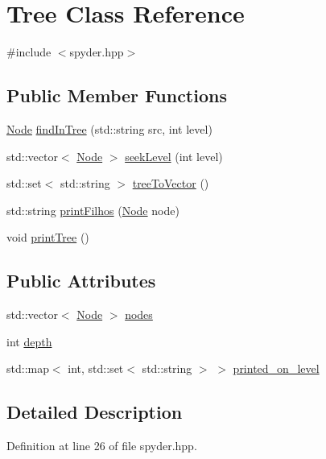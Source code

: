 \hypertarget{class_tree}{}\section{Tree Class Reference}
\label{class_tree}


{\ttfamily \#include $<$spyder.\+hpp$>$}

\subsection*{Public Member Functions}
\begin{DoxyCompactItemize}
\item 
\hyperlink{class_node}{Node} \hyperlink{class_tree_ad882c6f8facefed5874a603852cd3241}{find\+In\+Tree} (std\+::string src, int level)
\item 
std\+::vector$<$ \hyperlink{class_node}{Node} $>$ \hyperlink{class_tree_a5f27896a82db339aa51367b16e943075}{seek\+Level} (int level)
\item 
std\+::set$<$ std\+::string $>$ \hyperlink{class_tree_a1431f9f1aa001db35efbf359529865ee}{tree\+To\+Vector} ()
\item 
std\+::string \hyperlink{class_tree_a8345fdedbeae0557714f1f018f7d6001}{print\+Filhos} (\hyperlink{class_node}{Node} node)
\item 
void \hyperlink{class_tree_adf924fbe92e157bf8fcbc4ac6ea68aac}{print\+Tree} ()
\end{DoxyCompactItemize}
\subsection*{Public Attributes}
\begin{DoxyCompactItemize}
\item 
std\+::vector$<$ \hyperlink{class_node}{Node} $>$ \hyperlink{class_tree_aa48810b7e06dd70e4ed128ca4a42325f}{nodes}
\item 
int \hyperlink{class_tree_aee829f12b9755333a0196190fbe07f1b}{depth}
\item 
std\+::map$<$ int, std\+::set$<$ std\+::string $>$ $>$ \hyperlink{class_tree_a31853ff24c8b15101fd1313582aacb9d}{printed\+\_\+on\+\_\+level}
\end{DoxyCompactItemize}


\subsection{Detailed Description}


Definition at line 26 of file spyder.\+hpp.



